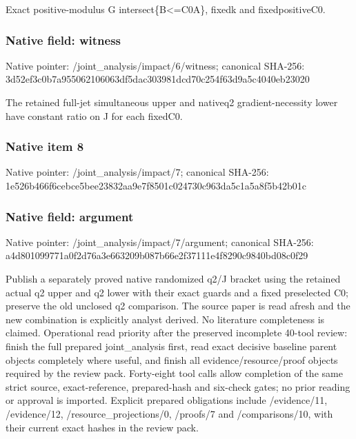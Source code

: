 \documentclass[10pt,a4paper]{article}
\begin{document}
\begingroup\raggedright\sloppy Exact positive-modulus G intersect\{B<=\allowbreak{}C0A\},\allowbreak{} fixedk and fixedpositiveC0.\par\endgroup

\subsubsection{Native field: witness}
Native pointer: /joint\_\allowbreak{}analysis/impact/6/witness; canonical SHA-256: 3d52ef3c0b7a955062106063df5dac303981dcd70c254f63d9a5c4040eb23020

\begingroup\raggedright\sloppy The retained full-jet simultaneous upper and nativeq2 gradient-necessity lower have constant ratio on J for each fixedC0.\par\endgroup

\subsubsection{Native item 8}
Native pointer: /joint\_\allowbreak{}analysis/impact/7; canonical SHA-256: 1e526b466f6cebce5bee23832aa9e7f8501c024730c963da5c1a5a8f5b42b01c

\subsubsection{Native field: argument}
Native pointer: /joint\_\allowbreak{}analysis/impact/7/argument; canonical SHA-256: a4d801099771a0f2d76a3e663209b087b66e2f37111e4f8290c9840bd08c0f29

\begingroup\raggedright\sloppy Publish a separately proved native randomized q2/\allowbreak{}J bracket using the retained actual q2 upper and q2 lower with their exact guards and a fixed preselected C0;\allowbreak{} preserve the old unclosed q2 comparison. The source paper is read afresh and the new combination is explicitly analyst derived. No literature completeness is claimed. Operational read priority after the preserved incomplete 40-tool review:\allowbreak{} finish the full prepared joint\_\allowbreak{}analysis first,\allowbreak{} read exact decisive baseline parent objects completely where useful,\allowbreak{} and finish all evidence/\allowbreak{}resource/\allowbreak{}proof objects required by the review pack. Forty-eight tool calls allow completion of the same strict source,\allowbreak{} exact-reference,\allowbreak{} prepared-hash and six-check gates;\allowbreak{} no prior reading or approval is imported. Explicit prepared obligations include /\allowbreak{}evidence/\allowbreak{}11,\allowbreak{} /\allowbreak{}evidence/\allowbreak{}12,\allowbreak{} /\allowbreak{}resource\_\allowbreak{}projections/\allowbreak{}0,\allowbreak{} /\allowbreak{}proofs/\allowbreak{}7 and /\allowbreak{}comparisons/\allowbreak{}10,\allowbreak{} with their current exact hashes in the review pack.\par\endgroup
\end{document}
